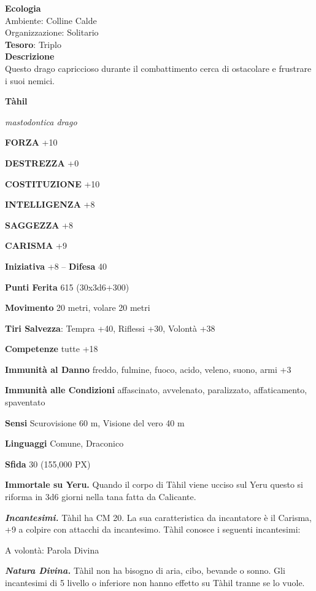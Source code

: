 \begin{multicols}{2}
\textbf{Ecologia}\\
Ambiente: Colline Calde\\
Organizzazione: Solitario\\
\textbf{Tesoro}: Triplo\\
\textbf{Descrizione}\\
Questo drago capriccioso durante il combattimento cerca di ostacolare e frustrare i suoi nemici.

\medskip{}\textbf{Tàhil}

\textit{mastodontica drago}

\textbf{FORZA} +10

\textbf{DESTREZZA} +0

\textbf{COSTITUZIONE} +10

\textbf{INTELLIGENZA} +8

\textbf{SAGGEZZA} +8

\textbf{CARISMA} +9

\textbf{Iniziativa} +8 -- \textbf{Difesa} 40

\textbf{Punti Ferita} 615 (30x3d6+300)

\textbf{Movimento} 20 metri, volare 20 metri

\textbf{Tiri Salvezza}: Tempra +40, Riflessi +30, Volontà +38

\textbf{Competenze} tutte +18

\textbf{Immunità al Danno} freddo, fulmine, fuoco, acido, veleno, suono, armi +3

\textbf{Immunità alle Condizioni} affascinato, avvelenato, paralizzato, affaticamento, spaventato

\textbf{Sensi} Scurovisione 60 m, Visione del vero 40 m

\textbf{Linguaggi} Comune, Draconico

\textbf{Sfida} 30 (155,000 PX)

\textbf{Immortale su Yeru.} Quando il corpo di Tàhil viene ucciso sul Yeru questo si riforma in 3d6 giorni nella tana fatta da Calicante.

\textit{\textbf{Incantesimi.}} Tàhil ha CM 20. La sua caratteristica da incantatore è il Carisma, +9 a colpire con attacchi da incantesimo. Tàhil conosce i seguenti incantesimi:

A volontà: Parola Divina

\textit{\textbf{Natura Divina.}} Tàhil non ha bisogno di aria, cibo, bevande o sonno. Gli incantesimi di 5 livello o inferiore non hanno effetto su Tàhil tranne se lo vuole.


\end{multicols}
